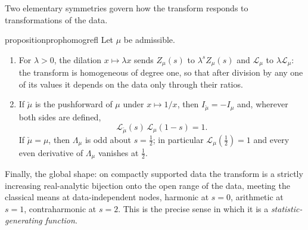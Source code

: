 \documentclass[sn-mathphys-num]{sn-jnl}
\theoremstyle{thmstyleone}%
\theoremstyle{thmstyletwo}%
\theoremstyle{thmstylethree}%
\theoremstyle{thmstyleone}%
\providecommand{\Leh}{\mathscr{L}}
\begin{document}
	Two elementary symmetries govern how the transform responds to
	transformations of the data.
	
	\begin{restatable}{proposition}{prophomogrefl}\label{prop:homogrefl}
		Let $\mu$ be admissible.
		\begin{enumerate}[label=\textup{(\roman*)},leftmargin=2.2em]
			\item For $\lambda>0$, the dilation $x\mapsto\lambda x$ sends
			$Z_\mu(s)$ to $\lambda^{s}Z_\mu(s)$ and $\Leh_\mu$ to
			$\lambda\Leh_\mu$: the transform is homogeneous of degree one,
			so that after division by any one of its values it depends on
			the data only through their ratios.
			\item If $\check\mu$ is the pushforward of $\mu$ under
			$x\mapsto1/x$, then $I_{\check\mu}=-I_\mu$ and, wherever both
			sides are defined,
			\begin{equation}\label{eq:reflection}
				\Leh_{\check\mu}(s)\,\Leh_\mu(1-s)=1 .
			\end{equation}
			If $\check\mu=\mu$, then $\Lambda_\mu$ is odd about
			$s=\tfrac12$; in particular $\Leh_\mu(\tfrac12)=1$ and every
			even derivative of $\Lambda_\mu$ vanishes at $\tfrac12$.
		\end{enumerate}
	\end{restatable}
	
	
	Finally, the global shape: on compactly supported data the transform
	is a strictly increasing real-analytic bijection onto the open range
	of the data, meeting the classical means at data-independent nodes,
	harmonic at $s=0$, arithmetic at $s=1$, contraharmonic at $s=2$.
	This is the precise sense in which it is a
	\emph{statistic-generating function}.
	
\end{document}
